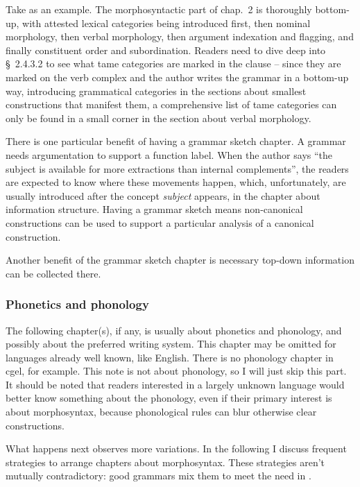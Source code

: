 \documentclass[UTF8, a4paper, oneside, scheme=plain]{ctexart}
\newcommand*{\citesec}[1]{\S~{#1}}
\newcommand*{\citechap}[1]{chap.~{#1}}
\newcommand*{\term}[1]{\emph{#1}}
\begin{document}
Take \citet{jacques2021grammar} as an example.
The morphosyntactic part of \citechap{2} is thoroughly bottom-up,
with attested lexical categories being introduced first,
then nominal morphology,
then verbal morphology,
then argument indexation and flagging,
and finally constituent order and subordination.
Readers need to dive deep into \citesec{2.4.3.2} to see what \ac{tame} categories are marked in the clause
-- since they are marked on the verb complex 
and the author writes the grammar in a bottom-up way,
introducing grammatical categories in the sections about smallest constructions 
that manifest them,
a comprehensive list of \ac{tame} categories can only be found 
in a small corner in the section about verbal morphology.

There is one particular benefit of having a grammar sketch chapter.
A grammar needs argumentation to support a function label.
When the author says ``the subject is available for more extractions than internal complements'',
the readers are expected to know where these movements happen,
which, unfortunately,
are usually introduced after the concept \term{subject} appears,
in the chapter about information structure.
Having a grammar sketch means non-canonical constructions 
can be used to support a particular analysis of a canonical construction.

Another benefit of the grammar sketch chapter is necessary top-down information can be collected there.

\subsubsection{Phonetics and phonology}

The following chapter(s), if any, is usually about phonetics and phonology,
and possibly about the preferred writing system.
This chapter may be omitted for languages already well known, like English.
There is no phonology chapter in \ac{cgel}, for example.
This note is not about phonology, so I will just skip this part.
It should be noted that readers interested in a largely unknown language 
would better know something about the phonology,
even if their primary interest is about morphosyntax,
because phonological rules can blur otherwise clear constructions.

What happens next observes more variations.
In the following I discuss frequent strategies to arrange chapters about morphosyntax.
These strategies aren't mutually contradictory:
good grammars mix them to meet the need in .
\end{document}
